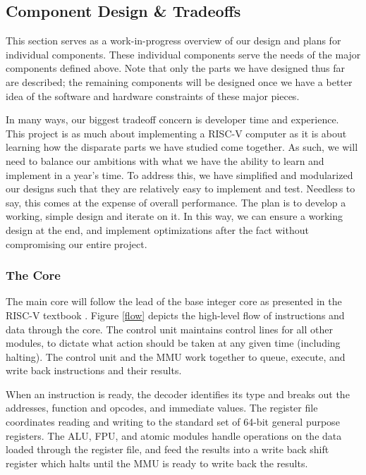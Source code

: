 \documentclass{article}
\begin{document}
\subsection{Component Design \& Tradeoffs}
    This section serves as a work-in-progress overview of our design and plans for individual components.  These individual components serve the needs of the major components defined above.  Note that only the parts we have designed thus far are described; the remaining components will be designed once we have a better idea of the software and hardware constraints of these major pieces.
    
    In many ways, our biggest tradeoff concern is developer time and experience.  This project is as much about implementing a RISC-V computer as it is about learning how the disparate parts we have studied come together.  As such, we will need to balance our ambitions with what we have the ability to learn and implement in a year's time.  To address this, we have simplified and modularized our designs such that they are relatively easy to implement and test.  Needless to say, this comes at the expense of overall performance.  The plan is to develop a working, simple design and iterate on it.  In this way, we can ensure a working design at the end, and implement optimizations after the fact without compromising our entire project.
    
    \subsubsection{The Core}
    The main core will follow the lead of the base integer core as presented in the RISC-V textbook \cite{RISCV_TEXT}.  Figure \ref{flow} depicts the high-level flow of instructions and data through the core.  The control unit maintains control lines for all other modules, to dictate what action should be taken at any given time (including halting).  The control unit and the MMU work together to queue, execute, and write back instructions and their results.
    
    When an instruction is ready, the decoder identifies its type and breaks out the addresses, function and opcodes, and immediate values.  The register file coordinates reading and writing to the standard set of 64-bit general purpose registers.  The ALU, FPU, and atomic modules handle operations on the data loaded through the register file, and feed the results into a write back shift register which halts until the MMU is ready to write back the results.
    
\end{document}
